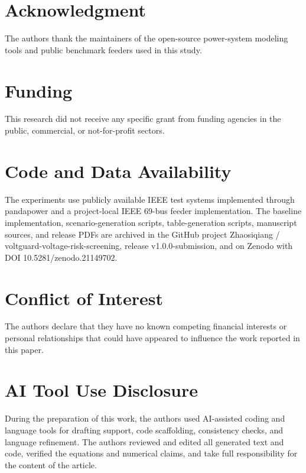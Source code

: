 \documentclass[
  journal]{IEEEtran}
\begin{document}
\section*{Acknowledgment}\label{acknowledgment}

The authors thank the maintainers of the open-source power-system
modeling tools and public benchmark feeders used in this study.

\section*{Funding}\label{funding}

This research did not receive any specific grant from funding agencies
in the public, commercial, or not-for-profit sectors.

\section*{Code and Data Availability}\label{code-and-data-availability}

The experiments use publicly available IEEE test systems implemented
through pandapower and a project-local IEEE 69-bus feeder
implementation. The baseline implementation, scenario-generation
scripts, table-generation scripts, manuscript sources, and release PDFs
are archived in the GitHub project Zhaosiqiang /
voltguard-voltage-risk-screening, release v1.0.0-submission, and on
Zenodo with DOI 10.5281/zenodo.21149702.

\section*{Conflict of Interest}\label{conflict-of-interest}

The authors declare that they have no known competing financial
interests or personal relationships that could have appeared to
influence the work reported in this paper.

\section*{AI Tool Use Disclosure}\label{ai-tool-use-disclosure}

During the preparation of this work, the authors used AI-assisted coding
and language tools for drafting support, code scaffolding, consistency
checks, and language refinement. The authors reviewed and edited all
generated text and code, verified the equations and numerical claims,
and take full responsibility for the content of the article.
\end{document}
